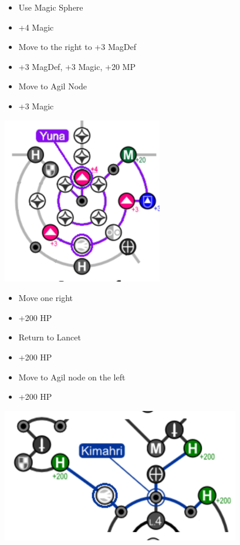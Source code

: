 \begin{multicols}{2}
\begin{spheregrid}
	\begin{itemize}
	\yunaf
	\begin{itemize}
		\item Use Magic Sphere
		\item +4 Magic
		\item Move to the right to +3 MagDef
		\item +3 MagDef, +3 Magic, +20 MP
		\item Move to Agil Node
		\item +3 Magic
	\end{itemize}
	\includegraphics{graphics/yunammr}
	\kimahrif
	\begin{itemize}
		\item Move one right
		\item +200 HP
		\item Return to Lancet
		\item +200 HP
		\item Move to Agil node on the left
		\item +200 HP
	\end{itemize}
	\includegraphics{graphics/kimahrimmr}
	\wakkaf
	\begin{itemize}

\end{itemize}
\end{itemize}
\end{spheregrid}
\end{multicols}
